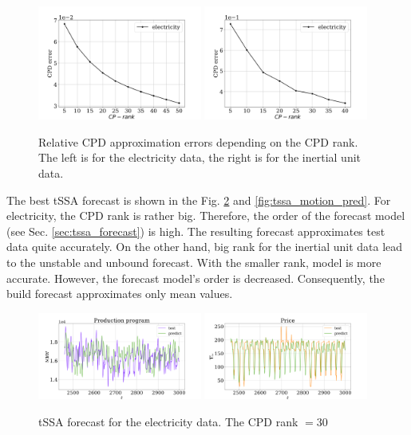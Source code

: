 \documentclass[referee, pdflatex, sn-mathphys-num]{sn-jnl}
\theoremstyle{definition}
\theoremstyle{plain}
\begin{document}
	\begin{figure}[h]
		\centering
		\includegraphics[width=0.48\textwidth, keepaspectratio]{CPD_error_elec.png}
		\includegraphics[width=0.48\textwidth, keepaspectratio]{CPD_error_motion.png}
		\caption{Relative CPD approximation errors depending on the CPD rank. The left is for the electricity data, the right is for the inertial unit data.}\label{fig:cpd_errors}
	\end{figure}
	
	The best tSSA forecast is shown in the Fig. \ref{fig:tssa_electr_pred} and \ref{fig:tssa_motion_pred}. For electricity, the CPD rank is rather big. Therefore, the order of the forecast model (see Sec. \ref{sec:tssa_forecast}) is high. The resulting forecast approximates test data quite accurately. On the other hand, big rank for the inertial unit data lead to the unstable and unbound forecast. With the smaller rank, model is more accurate. However, the forecast model's order is decreased. Consequently, the build forecast approximates only mean values.
	
	\begin{figure}[h]
		\centering
		\includegraphics[width=0.48\textwidth, keepaspectratio]{Production_program_pred.png}
		\includegraphics[width=0.48\textwidth, keepaspectratio]{Price_pred.png}
		\caption{tSSA forecast for the electricity data. The CPD rank $ = 30 $}\label{fig:tssa_electr_pred}
	\end{figure}
	
\end{document}
